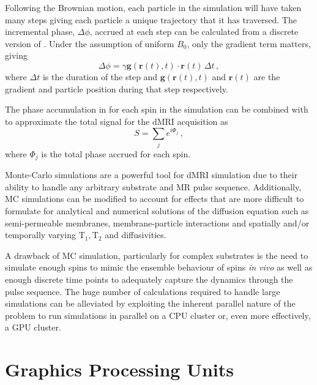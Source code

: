 Following the Brownian motion, each particle in the simulation will have taken many steps giving each particle a unique trajectory that it has traversed.
The incremental phase, $\Delta \phi$, accrued at each step can be calculated from a discrete version of . Under the assumption of uniform $B_0$, only the gradient term matters, giving
\begin{equation}
  \Delta \phi = \gamma \mathbf{g}(\mathbf{r}(t), t) \cdot \mathbf{r}(t)\, \Delta t \,,
  \label{eq:deltaPhi}
\end{equation}
where $\Delta t$ is the duration of the step and $\mathbf{g}(\mathbf{r}(t), t)$ and $\mathbf{r}(t)$ are the gradient and particle position during that step respectively.

The phase accumulation in  for each spin in the simulation can be combined with  to approximate the total signal for the \ac{dMRI} acquisition as
\begin{equation}
  S = \sum_j e^{i\Phi_j}\,,
  \label{eq:MCsignal}
\end{equation}
where $\Phi_j$ is the total phase accrued for each spin. 

Monte-Carlo simulations are a powerful tool for \ac{dMRI} simulation due to their ability to handle any arbitrary substrate and MR pulse sequence.
Additionally, \ac{MC} simulations can be modified to account for effects that are more difficult to formulate for analytical and numerical solutions of the diffusion equation such as semi-permeable membranes, membrane-particle interactions and spatially and/or temporally varying $\mathrm{T_1, T_2}$ and diffusivities.

A drawback of \ac{MC} simulation, particularly for complex substrates is the need to simulate enough spins to mimic the ensemble behaviour of spins \emph{in vivo} as well as enough discrete time points to adequately capture the dynamics through the pulse sequence.
The huge number of calculations required to handle large simulations can be alleviated by exploiting the inherent parallel nature of the problem to run simulations in parallel on a \ac{CPU} cluster or, even more effectively, a \ac{GPU} cluster.



\section{Graphics Processing Units}
\label{sec:bg_gpu}

